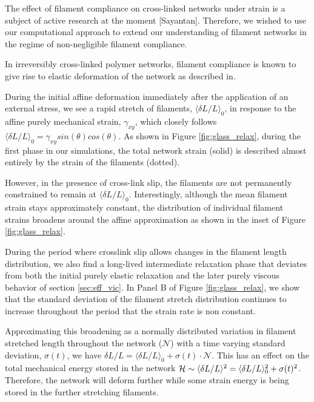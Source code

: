 The effect of filament compliance on cross-linked networks under strain is a subject of active research at the moment [Sayantan].  Therefore, we wished to use our computational approach to extend our understanding of filament networks in the regime of non-negligible filament compliance.  

In irreversibly cross-linked polymer networks, filament compliance is known to give rise to elastic deformation of the network as described in\cite{theo_hlm,theo_hlm2}.    

During the initial affine deformation immediately after the application of an external stress, we see a rapid stretch of filaments, $\langle \delta L/L\rangle_0$, in response to the affine purely mechanical strain, $\gamma_{xy}$, which closely follows $\langle \delta L/L\rangle_0 = \gamma_{xy}sin(\theta)cos(\theta)$. As shown in Figure \ref{fig:glass_relax}, during the first phase in our simulations, the total network strain (solid) is described almost entirely by the strain of the filaments (dotted).  

However, in the presence of cross-link slip, the filaments are not permanently constrained to remain at $\langle \delta L/L\rangle_0$.  Interestingly, although the mean filament strain stays approximately constant, the distribution of individual filament strains broadens around the affine approximation as shown in the inset of Figure \ref{fig:glass_relax}.  

During the period where crosslink slip allows changes in the filament length distribution, we also find a long-lived intermediate relaxation phase that deviates from both the initial purely elastic relaxation and the later purely viscous behavior of section \ref{sec:eff_vic}.  In Panel B of Figure \ref{fig:glass_relax}, we show that the standard deviation of the filament stretch distribution continues to increase throughout the period that the strain rate is non constant.   

Approximating this broadening as a normally distributed variation in filament stretched length throughout the network ($\mathcal{N}$) with a time varying standard deviation, $\sigma(t)$, we have $\delta L/L = \langle \delta L/L\rangle_0 + \sigma(t)\cdot\mathcal{N}$. 
 This has an effect on the total mechanical energy stored in the network ${\cal H} \sim  \langle\delta L/L\rangle^2 = \langle\delta L/L\rangle_0^2 +\sigma(t)^2 $.   Therefore, the network will deform further while some strain energy is being stored in the further stretching filaments.  



